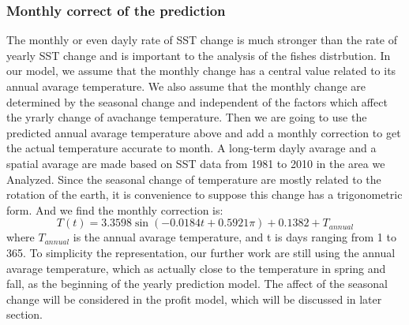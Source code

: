 \documentclass{mcmthesis}
\begin{document}
  
    
  \subsubsection{Monthly correct of the prediction}
    The monthly or even dayly rate of SST change is much stronger than the rate of yearly SST change and is important to the analysis of the fishes distrbution. In our model, we assume that the monthly change has a central value related to its annual avarage temperature. We also assume that the monthly change are determined by the seasonal change and independent of the factors which affect the yrarly change of avachange temperature. Then we are going to use the predicted annual avarage temperature above and add a monthly correction to get the actual temperature accurate to month. 
    A long-term dayly avarage and a spatial avarage are made based on SST data from 1981 to 2010 in the area we Analyzed. Since the seasonal change of temperature are mostly related to the rotation of the earth, it is convenience to suppose this change has a trigonometric form. And we find the monthly correction is: 
    \begin{equation}\label{}
      T(t)=3.3598\sin(-0.0184t+0.5921\pi)+0.1382+T_{annual}      
    \end{equation}
    where $T_{annual}$ is the annual avarage temperature, and t is days ranging from 1 to 365.
    To simplicity the representation, our further work are still using the annual avarage temperature, which as actually close to the temperature in spring and fall, as the beginning of the yearly prediction model. The affect of the seasonal change will be considered in the profit model, which will be discussed in later section. 
\end{document}
